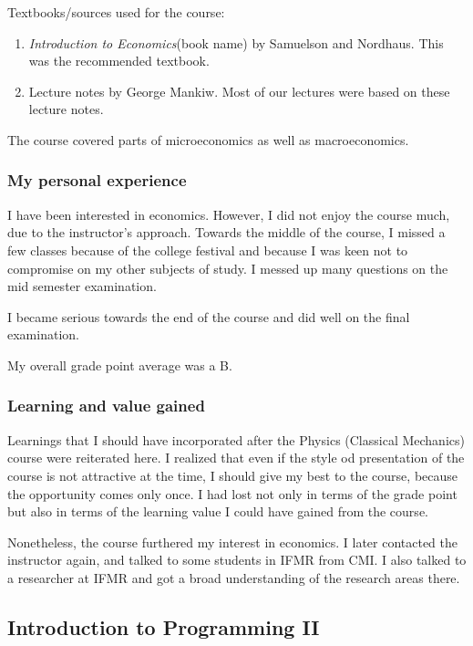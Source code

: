 \documentclass[a4paper]{amsart}
\newcommand{\bookname}[1]{{\em #1}{\small{(book name)}}}
\begin{document}
Textbooks/sources used for the course:

\begin{enumerate}

\item \bookname{Introduction to Economics} by Samuelson and Nordhaus. This was the recommended textbook.

\item Lecture notes by George Mankiw. Most of our lectures were based on these lecture notes.

\end{enumerate}

The course covered parts of microeconomics as well as macroeconomics.

\subsubsection{My personal experience}

I have been interested in economics. However, I did not enjoy the
course much, due to the instructor's approach.  Towards the middle of
the course, I missed a few classes because of the college festival and
because I was keen not to compromise on my other subjects of study.  I
messed up many questions on the mid semester examination.

I became serious towards the end of the course and did well on the 
final examination. 

My overall grade point average was a B.

\subsubsection{Learning and value gained}

Learnings that I should have incorporated after the Physics (Classical
Mechanics) course were reiterated here. I realized that even if the
style od presentation of the course is not attractive at the time, I
should give my best to the course, because the opportunity comes only
once. I had lost not only in terms of the grade point but also in
terms of the learning value I could have gained from the course.

Nonetheless, the course furthered my interest in economics.  I later
contacted the instructor again, and talked to some students in IFMR
from CMI.  I also talked to a researcher at IFMR and got a broad
understanding of the research areas there.

\subsection{Introduction to Programming II}\label{prog2}
\end{document}
